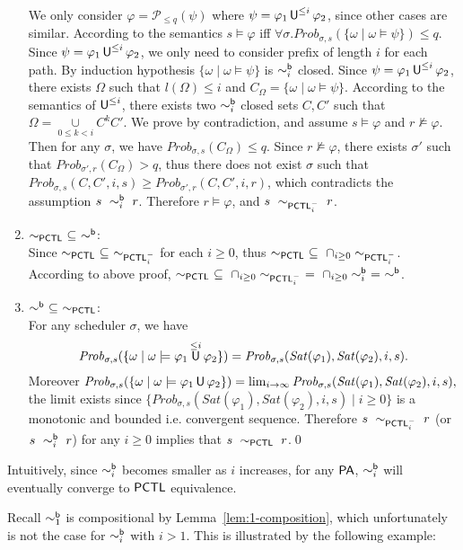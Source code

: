 \documentclass{LMCS}
\def\phi{\varphi}
\DeclareMathOperator{\U}{\text{\sf U}}
\newcommand{\PA}{{\sf PA}}
\newcommand{\PCTL}{{\sf PCTL}}
\newcommand{\iBSB}[1]{\sim_{#1}^{{\sf b}}}
\newcommand{\EPCTL}{\sim_{\PCTL}}
\newcommand{\iEPCTLM}[1]{\sim_{\PCTL^{-}_{#1}}}
\newcommand{\MC}[1]{\mathcal{#1}}
\newcommand{\MI}[1]{\mathit{#1}}
\newcommand{\MEASURE}{\mathit{Prob}}
\begin{document}
\begin{enumerate}[(1)]
We only consider $\phi=\MC{P}_{\leq q}(\psi)$ where
$\psi=\phi_1\U^{\leq i}\phi_2$, since other cases are
similar. According to the semantics $s\models\phi$ iff
$\forall\sigma.\MEASURE_{\sigma,s}(\{\omega\mid\omega\models\psi\})\leq
q$. Since $\psi=\phi_1\U^{\leq i}\phi_2$, we only need to consider
prefix of length $i$ for each path. 
By induction hypothesis $\{\omega\mid\omega\models\psi\}$ is $\iBSB{i}$ closed.
Since $\psi=\phi_1\U^{\leq i}\phi_2$, there exists
$\Omega$ such 
that $l(\Omega)\leq i$ and $C_\Omega=\{\omega\mid\omega\models\psi\}$. 
According to the semantics of $\U^{\leq i}$, 
there exists two $\iBSB{i}$ closed sets $C,C'$
such that $\Omega=\mathop{\cup}\limits_{0\leq k<i}C^kC'$. 
We prove by contradiction, and assume $s\models\phi$ and $r\not\models\phi$. Then
for any $\sigma$, we have $\MEASURE_{\sigma,s}(C_\Omega)\leq q$. Since
$r\not\models\phi$, there exists $\sigma'$ such that
$\MEASURE_{\sigma',r}(C_\Omega)>q$, thus there does not exist $\sigma$
such that
$\MEASURE_{\sigma,s}(C,C',i,s)\geq\MEASURE_{\sigma',r}(C,C',i,r)$,
which contradicts the assumption $s~\iBSB{i}~r$. Therefore
$r\models\phi$, and $s~\iEPCTLM{i}~r$.
\item $\EPCTL~\subseteq~\iBSB{}$:\\
Since $\EPCTL~\subseteq~\iEPCTLM{i}$ for each $i\ge 0$, thus $\EPCTL~\subseteq~\cap_{i\ge 0}\iEPCTLM{i}$. According to above proof, 
$\EPCTL~\subseteq~\cap_{i\ge 0}\iEPCTLM{i}~=~\cap_{i\ge 0}\iBSB{i}~=~\iBSB{}$.
\item $\iBSB{}~\subseteq~\EPCTL$:\\
For any scheduler $\sigma$, we have 
$$\MEASURE_{\sigma,s}(\{\omega\mid\omega\models\phi_1\U^{\le i}\phi_2\}) = \MEASURE_{\sigma,s}(\MI{Sat}(\phi_1),\MI{Sat}(\phi_2),i,s).$$ 
Moreover $
\MEASURE_{\sigma,s}(\{\omega\mid\omega\models\phi_1\U\phi_2\})
=\lim_{i\rightarrow\infty}\MEASURE_{\sigma,s}(\MI{Sat}(\phi_1),\MI{Sat}(\phi_2),i,s),
$
the limit exists since $\{\MEASURE_{\sigma,s}(\MI{Sat}(\phi_1),\MI{Sat}(\phi_2),i,s)\mid i\ge 0\}$ is a monotonic and bounded i.e. convergent sequence. Therefore $s~\iEPCTLM{i}~r$ (or $s~\iBSB{i}~r$) for any $i\ge 0$ 
implies that $s~\EPCTL~r$.\qed 
\end{enumerate}


Intuitively, since $\iBSB{i}$ becomes smaller as $i$ increases, for any $\PA$, $\iBSB{i}$ will eventually converge to $\PCTL$ equivalence.

Recall $\iBSB{1}$ is compositional by Lemma~\ref{lem:1-composition}, which unfortunately is not the case for $\iBSB{i}$ with $i>1$. This is illustrated by the following example:
\end{document}
